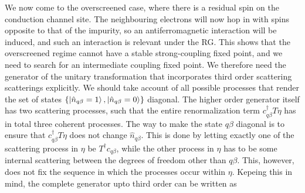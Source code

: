 \documentclass[reprint,prb,superscriptaddress]{revtex4-2}
\begin{document}
We now come to the overscreened case, where there is a residual spin on the conduction channel site. The neighbouring electrons will now hop in with spins opposite to that of the impurity, so an antiferromagnetic interaction will be induced, and such an interaction is relevant under the RG. This shows that the overscreened regime cannot have a stable strong-coupling fixed point, and we need to search for an intermediate coupling fixed point. We therefore need the generator of the unitary transformation that incorporates third order scattering scatterings explicitly. We should take account of all possible processes that render the set of states \(\left\{\ket{\hat n_{q\beta}=1},\ket{\hat n_{q\beta}=0}\right\}\) diagonal. The higher order generator itself has two scattering processes, such that the entire renormalization term \(c^\dagger_{q\beta} T \eta\) has in total three coherent processes. The way to make the state \(q\beta\) diagonal is to ensure that \(c^\dagger_{q\beta} T \eta\) does not change \(\hat n_{q\beta}\). This is done by letting exactly one of the scattering process in \(\eta\)  be \(T^\dagger c_{q\beta}\), while the other process in \(\eta\) has to be some internal scattering between the degrees of freedom other than \(q\beta\). This, however, does not fix the sequence in which the processes occur within \(\eta\). Kepeing this in mind, the complete generator upto third order can be written as
\end{document}
